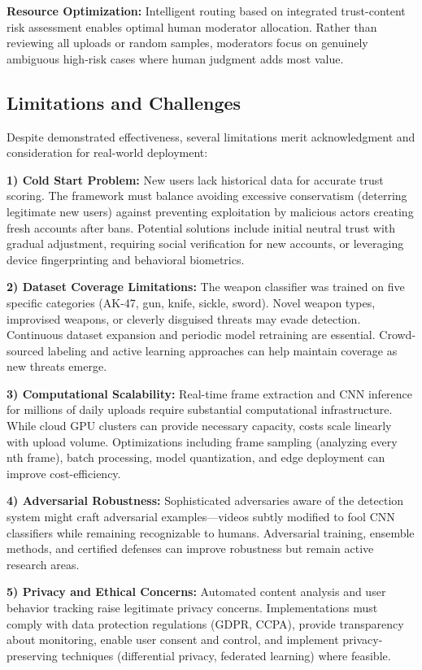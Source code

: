 \documentclass[conference]{IEEEtran}
\begin{document}
\textbf{Resource Optimization:} Intelligent routing based on integrated trust-content risk assessment enables optimal human moderator allocation. Rather than reviewing all uploads or random samples, moderators focus on genuinely ambiguous high-risk cases where human judgment adds most value.

\subsection{Limitations and Challenges}

Despite demonstrated effectiveness, several limitations merit acknowledgment and consideration for real-world deployment:

\textbf{1) Cold Start Problem:} New users lack historical data for accurate trust scoring. The framework must balance avoiding excessive conservatism (deterring legitimate new users) against preventing exploitation by malicious actors creating fresh accounts after bans. Potential solutions include initial neutral trust with gradual adjustment, requiring social verification for new accounts, or leveraging device fingerprinting and behavioral biometrics.

\textbf{2) Dataset Coverage Limitations:} The weapon classifier was trained on five specific categories (AK-47, gun, knife, sickle, sword). Novel weapon types, improvised weapons, or cleverly disguised threats may evade detection. Continuous dataset expansion and periodic model retraining are essential. Crowd-sourced labeling and active learning approaches can help maintain coverage as new threats emerge.

\textbf{3) Computational Scalability:} Real-time frame extraction and CNN inference for millions of daily uploads require substantial computational infrastructure. While cloud GPU clusters can provide necessary capacity, costs scale linearly with upload volume. Optimizations including frame sampling (analyzing every nth frame), batch processing, model quantization, and edge deployment can improve cost-efficiency.

\textbf{4) Adversarial Robustness:} Sophisticated adversaries aware of the detection system might craft adversarial examples—videos subtly modified to fool CNN classifiers while remaining recognizable to humans. Adversarial training, ensemble methods, and certified defenses can improve robustness but remain active research areas.

\textbf{5) Privacy and Ethical Concerns:} Automated content analysis and user behavior tracking raise legitimate privacy concerns. Implementations must comply with data protection regulations (GDPR, CCPA), provide transparency about monitoring, enable user consent and control, and implement privacy-preserving techniques (differential privacy, federated learning) where feasible.
\end{document}

